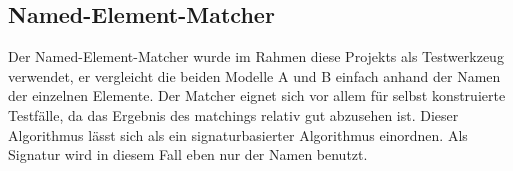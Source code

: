 % 

\subsection{Named-Element-Matcher}
\label{nem}

Der Named-Element-Matcher wurde im Rahmen diese Projekts als Testwerkzeug verwendet, er vergleicht
die beiden Modelle A und B einfach anhand der Namen der einzelnen Elemente. Der Matcher eignet sich
vor allem für selbst konstruierte Testfälle, da das Ergebnis des matchings relativ gut abzusehen
ist. Dieser Algorithmus lässt sich als ein signaturbasierter Algorithmus einordnen. Als Signatur
wird in diesem Fall eben nur der Namen benutzt.
